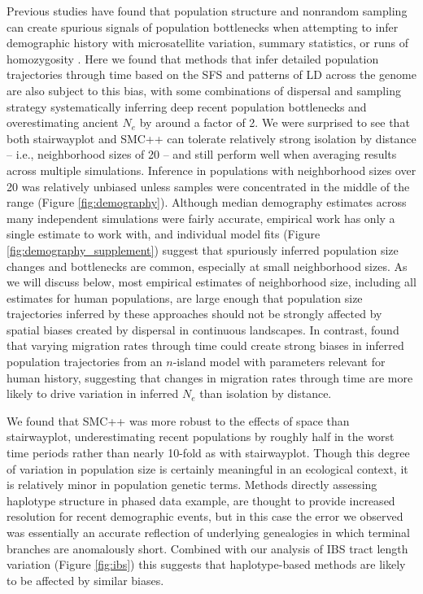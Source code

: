 \documentclass[10pt,twoside,lineno,hidelinks]{preprint}
\begin{document}
Previous studies have found that population structure and nonrandom sampling can create spurious signals of population bottlenecks when attempting to infer demographic history with microsatellite variation, summary statistics, or runs of homozygosity \citep{Chikhi2010,Stadler2009,Ptak2002,Mazet2015}. Here we found that methods that infer detailed population trajectories through time based on the SFS and patterns of LD across the genome are also subject to this bias, with some combinations of dispersal and sampling strategy systematically inferring deep recent population bottlenecks and overestimating ancient $N_{e}$ by around a factor of 2. We were surprised to see that both stairwayplot and SMC++ can tolerate relatively strong isolation by distance -- i.e., neighborhood sizes of 20 -- and still perform well when averaging results across multiple simulations. Inference in populations with neighborhood sizes over 20 was relatively unbiased unless samples were concentrated in the middle of the range (Figure \ref{fig:demography}). 
Although median demography estimates across many independent simulations were fairly accurate,
empirical work has only a single estimate to work with,
and individual model fits (Figure \ref{fig:demography_supplement})
suggest that spuriously inferred population size changes and bottlenecks are common, especially at small neighborhood sizes.
As we will discuss below, most empirical estimates of neighborhood size, including all estimates for human populations, are large enough that population size trajectories inferred by these approaches should not be strongly affected by spatial biases created by dispersal in continuous landscapes. In contrast, \citet{Mazet2015} found that varying migration rates through time could create strong biases in inferred population trajectories from an $n$-island model with parameters relevant for human history, suggesting that changes in migration rates through time are more likely to drive variation in inferred $N_{e}$ than isolation by distance. 

We found that SMC++ was more robust to the effects of space than stairwayplot, underestimating recent populations by roughly half in the worst time periods rather than nearly 10-fold as with stairwayplot. Though this degree of variation in population size is certainly meaningful in an ecological context, it is relatively minor in population genetic terms. 
Methods directly assessing haplotype structure in phased data example, \citep[e.g.,][]{browning2015accurate} are thought to provide increased resolution for recent demographic events,
but in this case the error we observed was essentially an accurate reflection of underlying genealogies in which terminal branches are anomalously short. Combined with our analysis of IBS tract length variation (Figure \ref{fig:ibs}) this suggests that haplotype-based methods are likely to be affected by similar biases. 
\end{document}
